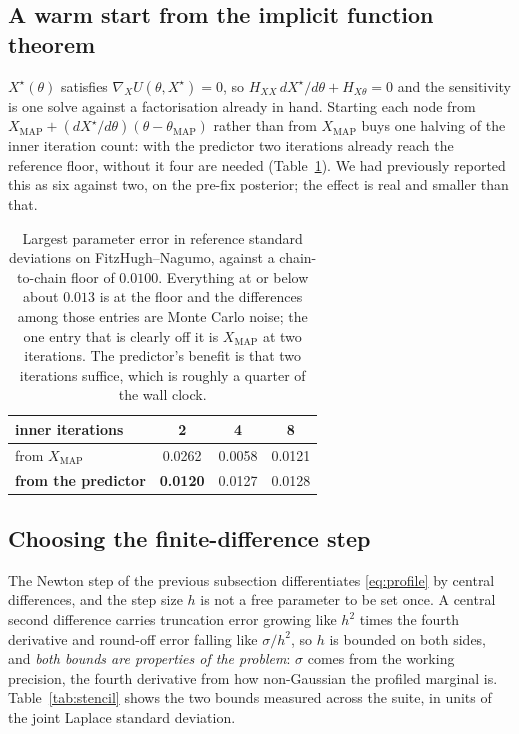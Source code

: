 \documentclass[11pt]{article}
\theoremstyle{plain}
\theoremstyle{definition}
\theoremstyle{remark}
\begin{document}
\subsection{A warm start from the implicit function theorem}

$X^\star(\theta)$ satisfies $\nabla_X U(\theta, X^\star) = 0$, so
$H_{XX}\,dX^\star/d\theta + H_{X\theta} = 0$ and the sensitivity is one solve against a
factorisation already in hand. Starting each node from
$X_{\mathrm{MAP}} + (dX^\star/d\theta)(\theta - \theta_{\mathrm{MAP}})$ rather than from
$X_{\mathrm{MAP}}$ buys one halving of the inner iteration count: with the predictor two
iterations already reach the reference floor, without it four are needed
(Table~\ref{tab:predictor}). We had previously reported this as six against two, on the pre-fix
posterior; the effect is real and smaller than that.

\begin{table}[t]
\centering\small
\begin{tabular}{lccc}
\toprule
inner iterations & 2 & 4 & 8\\
\midrule
from $X_{\mathrm{MAP}}$ & 0.0262 & 0.0058 & 0.0121\\
\textbf{from the predictor} & \textbf{0.0120} & 0.0127 & 0.0128\\
\bottomrule
\end{tabular}
\caption{Largest parameter error in reference standard deviations on FitzHugh--Nagumo, against a
chain-to-chain floor of $0.0100$. Everything at or below about $0.013$ is at the floor and the
differences among those entries are Monte Carlo noise; the one entry that is clearly off it is
$X_{\mathrm{MAP}}$ at two iterations. The predictor's benefit is that two iterations suffice, which
is roughly a quarter of the wall clock.}
\label{tab:predictor}
\end{table}

\subsection{Choosing the finite-difference step}
\label{sec:stencil}

The Newton step of the previous subsection differentiates \eqref{eq:profile} by central
differences, and the step size $h$ is not a free parameter to be set once. A central second
difference carries truncation error growing like $h^2$ times the fourth derivative and round-off
error falling like $\sigma/h^2$, so $h$ is bounded on both sides, and \emph{both bounds are
properties of the problem}: $\sigma$ comes from the working precision, the fourth derivative from
how non-Gaussian the profiled marginal is. Table~\ref{tab:stencil} shows the two bounds measured
across the suite, in units of the joint Laplace standard deviation.
\end{document}
